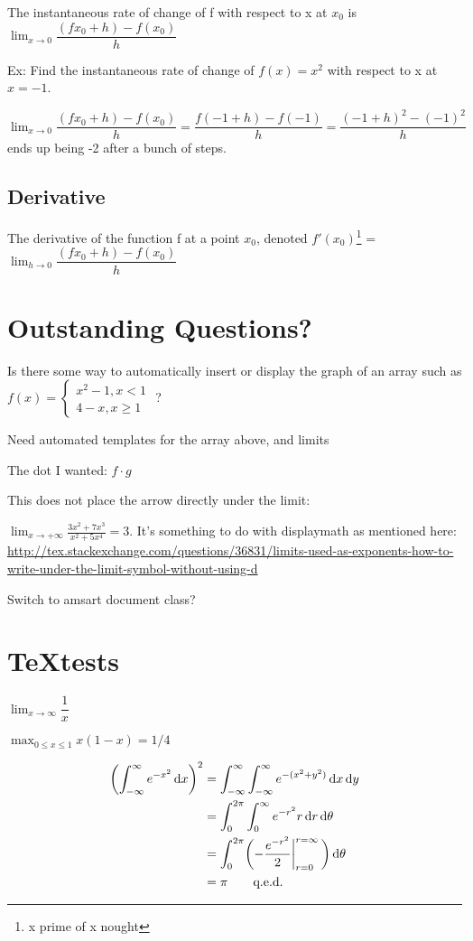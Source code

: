 \documentclass[12pt]{article}
\newcommand*\diff{\mathop{}\!\mathrm{d}}
\begin{document}
The instantaneous rate of change of f with respect to x at $x_{0}$ is $\lim_{x\to
  0}\dfrac{(fx_{0}+h)-f(x_{0})}{h}$

Ex: Find the instantaneous rate of change of $f(x)=x^{2}$ with respect to x at $x=-1$.

$\lim_{x\to 0}\dfrac{(fx_{0}+h)-f(x_{0})}{h} = \dfrac{f(-1+h)-f(-1)}{h} = \dfrac{(-1+h)^{2}-(-1)^{2}}{h}$ ends
up being -2 after a bunch of steps.

\subsection{Derivative}
The derivative of the function f at a point $x_{0}$, denoted $f'(x_{0})$\footnote{x prime of x nought} = $\lim_{h\to 0}\dfrac{(fx_{0}+h)-f(x_{0})}{h}$



\section{Outstanding Questions?}

Is there some way to automatically insert or display the graph of an array such as $f(x) = \left\{\begin{array}{l}
x^2-1,x < 1\\
4-x, x \geq 1
\end{array} \right. $ ?

Need automated templates for the array above, and limits

The dot I wanted: $f\cdot g$

This does not place the arrow directly under the limit:


$ \lim_{x \to +\infty} \frac{3x^2 +7x^3}{x^2 +5x^4} = 3. $
It's something to do with displaymath as mentioned here:
\url{http://tex.stackexchange.com/questions/36831/limits-used-as-exponents-how-to-write-under-the-limit-symbol-without-using-d}

Switch to amsart document class?

\section{\TeX tests}

$\lim_{x\to\infty}\dfrac{1}{x}$

 $\max_{0\le x\le 1}x(1-x)=1/4$


\begin{align*}
\biggl(\int_{-\infty}^\infty e^{-x^2}\diff x\biggr)^2 
  &= \int_{-\infty}^\infty\int_{-\infty}^\infty e^{-(x^2+y^2)}\diff x\diff y \\
  &= \int_0^{2\pi}\int_0^\infty e^{-r^2}r\diff r\diff\theta                  \\
  &= \int_0^{2\pi}\biggl(-{e^{-r^2}\over2}\bigg\vert_{r=0}^{r=\infty}\,\biggr)\diff\theta\\
  &= \pi                                          \tag*{q.e.d.}
\end{align*}
\end{document}
